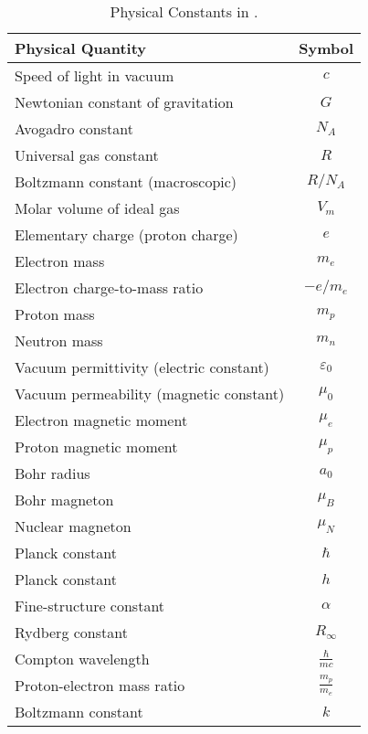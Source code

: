 \begin{table}[ht]
\centering
\caption{Physical Constants in {\judge}.}
\label{tabapp: physics_constant}
\begin{tabular}{|l|c|}
\hline
\textbf{Physical Quantity} & \textbf{Symbol} \\
\hline
Speed of light in vacuum & $ c $ \\
Newtonian constant of gravitation & $ G $ \\
Avogadro constant & $ N_A $ \\
Universal gas constant & $ R $ \\
Boltzmann constant (macroscopic) & $ R/N_A $ \\
Molar volume of ideal gas & $ V_m $ \\
Elementary charge (proton charge) & $ e $ \\
Electron mass & $ m_e $ \\
Electron charge-to-mass ratio & $ -e / m_e $ \\
Proton mass & $ m_p $ \\
Neutron mass & $ m_n $ \\
Vacuum permittivity (electric constant) & $ \varepsilon_0 $ \\
Vacuum permeability (magnetic constant) & $ \mu_0 $ \\
Electron magnetic moment & $ \mu_e $ \\
Proton magnetic moment & $ \mu_p $ \\
Bohr radius & $ a_0 $ \\
Bohr magneton & $ \mu_B $ \\
Nuclear magneton & $ \mu_N $ \\
Planck constant & $ \hbar $ \\
Planck constant & $ h $ \\
Fine-structure constant & $ \alpha $ \\
Rydberg constant & $ R_\infty $ \\
Compton wavelength & $ \frac{\hbar}{mc} $ \\
Proton-electron mass ratio & $ \frac{m_p}{m_e} $ \\
Boltzmann constant & $ k $ \\
\hline
\end{tabular}
\end{table}